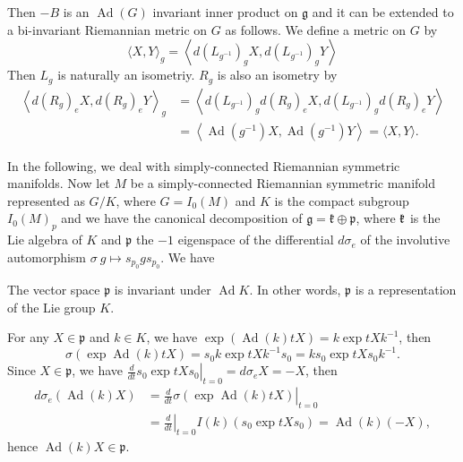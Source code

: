 Then $-B$ is an $\operatorname{Ad}(G)$ invariant inner product on
$\mathfrak{g}$ and it can be extended to a bi-invariant
Riemannian metric on $G$ as follows. We define a metric on $G$ by
\[
\langle X, Y\rangle_{g} = \left\langle
d\left(L_{g^{-1}}\right)_{g} X, d\left( L_{g^{-1}} \right)_{g}
Y\right\rangle
\]
Then $L_{g}$ is naturally an isometriy. $R_{g}$ is also an
isometry by 
\[
\begin{aligned}
	\left\langle d\left (R_{g} \right)_{e} X, d\left( R_{g}
	\right)_{e} Y\right\rangle_{g} & = \left\langle d\left(
	L_{g^{-1}} \right)_{g} d\left( R_{g} \right)_{e} X, d\left(
	L_{g^{-1}} \right)_{g} d\left( R_{g} \right)_{e}
	Y\right\rangle \\
	&=\left\langle\operatorname{Ad}\left(g^{-1}\right) X,
	\operatorname{Ad}\left( g^{-1} \right) Y\right\rangle=\langle
	X, Y\rangle.
\end{aligned}
\]


	In the following, we deal with simply-connected Riemannian
	symmetric manifolds. Now let $M$ be a simply-connected
	Riemannian symmetric manifold represented as $G / K$, where
	$G=I_{0}(M)$ and $K$ is the compact subgroup $I_0(M)_p$ and
	we have the canonical decomposition of $\mathfrak{g} =
	\mathfrak{k}\oplus\mathfrak{p}$,
	where ${\mathfrak k}$ is the Lie algebra of $K$ and $\mathfrak{p}$ 
	the $-1$ eigenspace of the differential
	$d \sigma_{e}$ of the involutive automorphism $\sigma
	\: g \mapsto s_{p_{0}} g s_{p_{0}} .$ We have

\begin{lemma}\label{229}
		The vector space $\mathfrak{p}$ is invariant under
		$\operatorname{Ad} K$. In other words, $\mathfrak{p}$ is
		a representation of the Lie group $K$.
\end{lemma}
\bproof
For any $X \in \mathfrak{p}$ and $k \in K$, we have $\exp
(\operatorname{Ad}(k) t X) = k \exp t X k^{-1}$, then
\[
\sigma(\exp \operatorname{Ad}(k) t X) = s_{0} k \exp t X k^{-1}
s_{0} = k s_{0} \exp t X s_{0} k^{-1}.
\]
Since $X \in \mathfrak{p}$, we have $\left.\frac{d}{d t} s_{0}
\exp t X s_{0}\right|_{t=0} = d\sigma_{e}X = -X$, then
\[
\begin{aligned}
	d \sigma_{e}(\operatorname{Ad}(k) X) & = \left.\frac{d}{d t}
	\sigma(\exp \operatorname{Ad}(k) t X)\right|_{t=0} \\
	& = \left.\frac{d}{d t}\right|_{t=0} I(k)\left(s_{0} \exp t
	Xs_{0}\right) = \operatorname{Ad}(k)(-X),
\end{aligned}
\]
hence $\operatorname{Ad}(k) X \in \mathfrak{p}$.
\eproof

